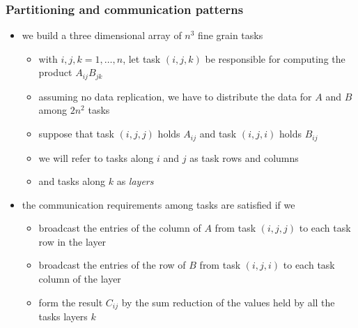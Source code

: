 \begin{frame}[fragile]
%
  \frametitle{Partitioning and communication patterns}
%
  \begin{itemize}
%
  \item we build a three dimensional array of $n^{3}$ fine grain tasks
    \begin{itemize}
    \item with $i,j,k = 1,\ldots,n$, let task $(i,j,k)$ be responsible for computing the
      product $A_{ij}B_{jk}$
    \item assuming no data replication, we have to distribute the data for $A$ and $B$ among
      $2n^{2}$ tasks
    \item suppose that task $(i,j,j)$ holds $A_{ij}$ and task $(i,j,i)$ holds $B_{ij}$
    \item we will refer to tasks along $i$ and $j$ as task rows and columns
    \item and tasks along $k$ as {\em layers}
    \end{itemize}
%
  \item the communication requirements among tasks are satisfied if we
    \begin{itemize}
    \item broadcast the entries of the  column of $A$ from task $(i,j,j)$ to each task
      row in the  layer
    \item broadcast the entries of the  row of $B$ from task $(i,j,i)$ to each task column of
      the  layer
    \item form the result $C_{ij}$ by the sum reduction of the values held by all the
      tasks layers $k$
    \end{itemize}
%
  \end{itemize}
%
\end{frame}


